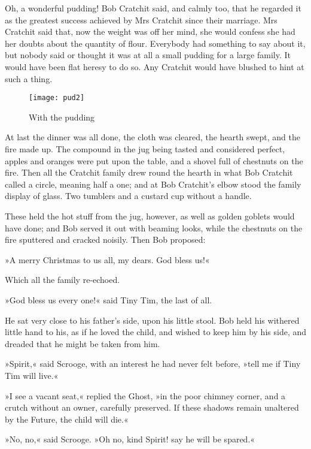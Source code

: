Oh, a wonderful pudding! Bob Cratchit said, and calmly too, that he regarded it as the greatest success achieved by Mrs Cratchit since their marriage. Mrs Cratchit said that, now the weight was off her mind, she would confess she had her doubts about the quantity of flour. Everybody had something to say about it, but nobody said or thought it was at all a small pudding for a large family. It would have been flat heresy to do so. Any Cratchit would have blushed to hint at such a thing.

\begin{figure}
\begin{minipage}[c]{\textwidth}
\texttt{[image: pud2]}
\caption{With the pudding}
\end{minipage}
\end{figure}


At last the dinner was all done, the cloth was cleared, the hearth swept, and the fire made up. The compound in the jug being tasted and considered perfect, apples and oranges were put upon the table, and a shovel full of chestnuts on the fire. Then all the Cratchit family drew round the hearth in what Bob Cratchit called a circle, meaning half a one; and at Bob Cratchit's elbow stood the family display of glass. Two tumblers and a custard cup without a handle.

These held the hot stuff from the jug, however, as well as golden goblets would have done; and Bob served it out with beaming looks, while the chestnuts on the fire sputtered and cracked noisily. Then Bob proposed:

»A merry Christmas to us all, my dears. God bless us!«

Which all the family re-echoed.

»God bless us every one!« said Tiny Tim, the last of all.

He sat very close to his father's side, upon his little stool. Bob held his withered little hand to his, as if he loved the child, and wished to keep him by his side, and dreaded that he might be taken from him.

»Spirit,« said Scrooge, with an interest he had never felt before, »tell me if Tiny Tim will live.«

»I see a vacant seat,« replied the Ghost, »in the poor chimney corner, and a crutch without an owner, carefully preserved. If these shadows remain unaltered by the Future, the child will die.«

»No, no,« said Scrooge. »Oh no, kind Spirit! say he will be spared.«


